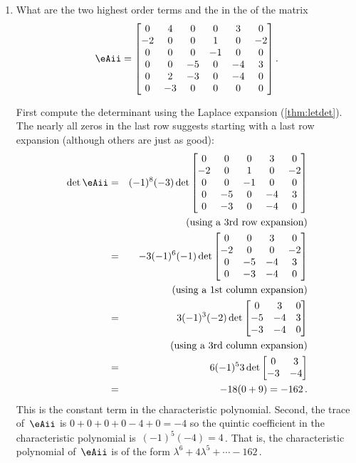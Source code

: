 \begin{example}
\begin{enumerate}
\item What are the two highest order terms and the  in the  of the matrix
\begin{equation*}
\eAii=\begin{bmatrix}0&4&0&0&3&0
\\-2&0&0&1&0&-2
\\0&0&0&-1&0&0
\\0&0&-5&0&-4&3
\\0&2&-3&0&-4&0
\\0&-3&0&0&0&0\end{bmatrix}.
\end{equation*}
\begin{solution} 
First compute the determinant using the Laplace expansion (\autoref{thm:letdet}).  
The nearly all zeros in the last row suggests starting with a last row expansion (although others are just as good):
\begin{eqnarray*}
\det \eAii&=&(-1)^8(-3)\det\begin{bmatrix}0&0&0&3&0
\\-2&0&1&0&-2
\\0&0&-1&0&0
\\0&-5&0&-4&3
\\0&-3&0&-4&0\end{bmatrix}
\\&&(\text{using a 3rd row expansion})
\\&=&-3(-1)^6(-1)\det\begin{bmatrix}0&0&3&0
\\-2&0&0&-2
\\0&-5&-4&3
\\0&-3&-4&0\end{bmatrix}
\\&&(\text{using a 1st column expansion})
\\&=&3(-1)^3(-2)\det\begin{bmatrix}0&3&0
\\-5&-4&3
\\-3&-4&0\end{bmatrix}
\\&&(\text{using a 3rd column expansion})
\\&=&6(-1)^53\det\begin{bmatrix}0&3
\\-3&-4\end{bmatrix}
\\&=&-18(0+9)=-162\,.
\end{eqnarray*}
This is the constant term in the characteristic polynomial.
Second, the trace of~\(\eAii\) is \(0+0+0+0-4+0=-4\) so the quintic coefficient in the characteristic polynomial is~\((-1)^5(-4)=4\)\,.
That is, the characteristic polynomial of~\(\eAii\) is of the form \(\lambda^6+4\lambda^5+\cdots-162\)\,.
\end{solution}

\end{enumerate}
\end{example}


